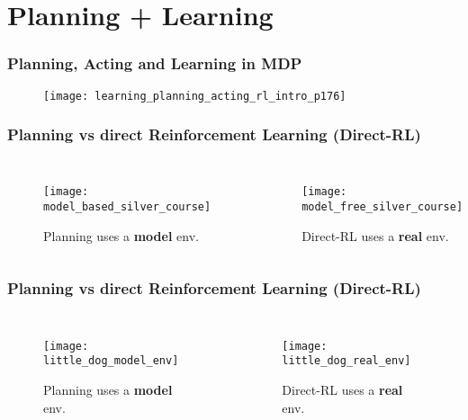 \section{Planning + Learning}

\begin{frame}
\frametitle{Planning, Acting and Learning in MDP}
\begin{figure}
    \centering
    \texttt{[image: learning\_planning\_acting\_rl\_intro\_p176]}
\end{figure}
\end{frame}

\begin{frame}
\frametitle{Planning vs direct Reinforcement Learning (Direct-RL)}
\begin{columns}
    \begin{figure}
        \centering
        \texttt{[image: model\_based\_silver\_course]}
        \caption{Planning uses a \textbf{model} env.}
    \end{figure}

    \begin{figure}
        \centering
        \texttt{[image: model\_free\_silver\_course]}
        \caption{Direct-RL uses a \textbf{real} env.}
    \end{figure}
\end{columns}
\end{frame}

\begin{frame}
\frametitle{Planning vs direct Reinforcement Learning (Direct-RL)}
\begin{columns}
    \begin{figure}
        \centering
        \texttt{[image: little\_dog\_model\_env]}
        \caption{Planning uses a \textbf{model} env.}
    \end{figure}

    \begin{figure}
        \centering
        \texttt{[image: little\_dog\_real\_env]}
        \caption{Direct-RL uses a \textbf{real} env.}
    \end{figure}
\end{columns}
\end{frame}

